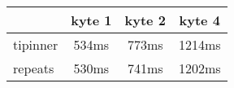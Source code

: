 \begin{tabular}{|l|c|c|c|}
\hline
 & kyte 1 & kyte 2 & kyte 4\\
\hline
tipinner &  534ms &  773ms &  1214ms\\
\hline
repeats &  530ms &  741ms &  1202ms\\
\hline
\end{tabular}
